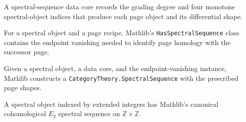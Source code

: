 \begin{definition}
  \label{def:mathlib-spectral-sequence-data-core}
  \mathlibok
  A spectral-sequence data core records the grading degree and four monotone
  spectral-object indices that produce each page object and its differential
  shape.
\end{definition}

\begin{definition}
  \label{def:mathlib-has-spectral-sequence}
  \mathlibok
  For a spectral object and a page recipe, Mathlib's
  \texttt{HasSpectralSequence} class contains the endpoint vanishing needed to
  identify page homology with the successor page.
\end{definition}

\begin{definition}
  \label{def:mathlib-spectral-object-spectral-sequence}
  \mathlibok
  Given a spectral object, a data core, and the endpoint-vanishing instance,
  Mathlib constructs a \texttt{CategoryTheory.SpectralSequence} with the
  prescribed page shapes.
\end{definition}

\begin{definition}
  \label{def:mathlib-e2-spectral-sequence}
  \mathlibok
  A spectral object indexed by extended integers has Mathlib's canonical
  cohomological $E_2$ spectral sequence on $\mathbb Z\times\mathbb Z$.
\end{definition}

